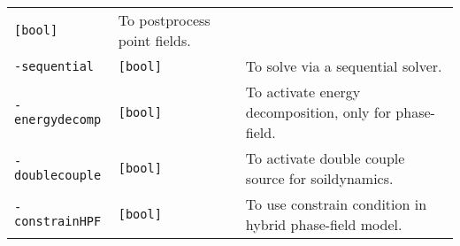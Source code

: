 \begin{longtable}[]{@{}lll@{}}
\begin{minipage}[t]{0.09\columnwidth}
\lstinline![bool]!\strut
\end{minipage} & \begin{minipage}[t]{0.56\columnwidth}\raggedright\strut
To postprocess point fields.\strut
\end{minipage}\tabularnewline
\begin{minipage}[t]{0.26\columnwidth}\raggedright\strut
\lstinline!-sequential!\strut
\end{minipage} & \begin{minipage}[t]{0.09\columnwidth}\raggedright\strut
\lstinline![bool]!\strut
\end{minipage} & \begin{minipage}[t]{0.56\columnwidth}\raggedright\strut
To solve via a sequential solver.\strut
\end{minipage}\tabularnewline
\begin{minipage}[t]{0.26\columnwidth}\raggedright\strut
\lstinline!-energydecomp!\strut
\end{minipage} & \begin{minipage}[t]{0.09\columnwidth}\raggedright\strut
\lstinline![bool]!\strut
\end{minipage} & \begin{minipage}[t]{0.56\columnwidth}\raggedright\strut
To activate energy decomposition, only for phase-field.\strut
\end{minipage}\tabularnewline
\begin{minipage}[t]{0.26\columnwidth}\raggedright\strut
\lstinline!-doublecouple!\strut
\end{minipage} & \begin{minipage}[t]{0.09\columnwidth}\raggedright\strut
\lstinline![bool]!\strut
\end{minipage} & \begin{minipage}[t]{0.56\columnwidth}\raggedright\strut
To activate double couple source for soildynamics.\strut
\end{minipage}\tabularnewline
\begin{minipage}[t]{0.26\columnwidth}\raggedright\strut
\lstinline!-constrainHPF!\strut
\end{minipage} & \begin{minipage}[t]{0.09\columnwidth}\raggedright\strut
\lstinline![bool]!\strut
\end{minipage} & \begin{minipage}[t]{0.56\columnwidth}\raggedright\strut
To use constrain condition in hybrid phase-field model.\strut
\end{minipage}\tabularnewline

\end{longtable}
